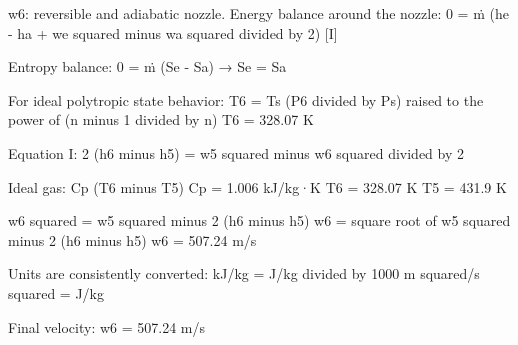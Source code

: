 w6: reversible and adiabatic nozzle.  
Energy balance around the nozzle:  
0 = ṁ (he - ha + we squared minus wa squared divided by 2) [I]  

Entropy balance:  
0 = ṁ (Se - Sa) → Se = Sa  

For ideal polytropic state behavior:  
T6 = Ts (P6 divided by Ps) raised to the power of (n minus 1 divided by n)  
T6 = 328.07 K  

Equation I:  
2 (h6 minus h5) = w5 squared minus w6 squared divided by 2  

Ideal gas:  
Cp (T6 minus T5)  
Cp = 1.006 kJ/kg·K  
T6 = 328.07 K  
T5 = 431.9 K  

w6 squared = w5 squared minus 2 (h6 minus h5)  
w6 = square root of w5 squared minus 2 (h6 minus h5)  
w6 = 507.24 m/s  

Units are consistently converted:  
kJ/kg = J/kg divided by 1000  
m squared/s squared = J/kg  

Final velocity:  
w6 = 507.24 m/s